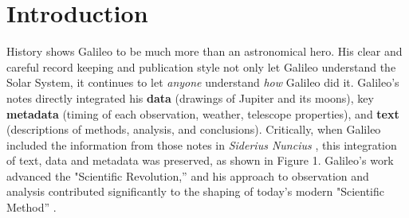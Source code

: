 \section{Introduction}
History shows Galileo to be much more than an
astronomical hero. His clear and careful record keeping and
publication style not only let Galileo understand the Solar System, it
continues to let \emph{anyone} understand \emph{how} Galileo did it.
Galileo's notes directly integrated his \textbf{data} (drawings of
Jupiter and its moons), key \textbf{metadata} (timing of each
observation, weather, telescope properties), and \textbf{text}
(descriptions of methods, analysis, and conclusions). Critically, when
Galileo included the information from those notes in \emph{Siderius
Nuncius} \cite{galilei}, this integration of text, data and metadata was
preserved, as shown in Figure 1. Galileo's work advanced the
"Scientific Revolution,'' and his approach to observation and analysis
contributed significantly to the shaping of today's modern "Scientific
Method'' \cite{galilei1618assayer,galilei1957discoveries}. 